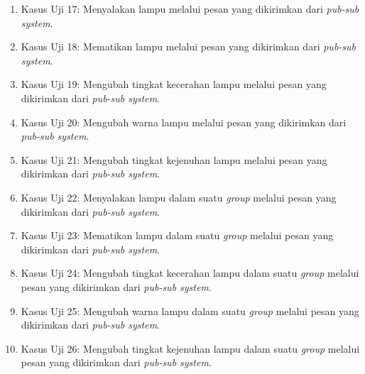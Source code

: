 \begin{enumerate}
	\item Kasus Uji 17: Menyalakan lampu melalui pesan yang dikirimkan dari \textit{pub-sub system}.
	\item Kasus Uji 18: Mematikan lampu melalui pesan yang dikirimkan dari \textit{pub-sub system}.
	\item Kasus Uji 19: Mengubah tingkat kecerahan lampu melalui pesan yang dikirimkan dari \textit{pub-sub system}.
	\item Kasus Uji 20: Mengubah warna lampu melalui pesan yang dikirimkan dari \textit{pub-sub system}.
	\item Kasus Uji 21: Mengubah tingkat kejenuhan lampu melalui pesan yang dikirimkan dari \textit{pub-sub system}.
	\item Kasus Uji 22: Menyalakan lampu dalam suatu \textit{group} melalui pesan yang dikirimkan dari \textit{pub-sub system}.
	\item Kasus Uji 23: Mematikan lampu dalam suatu \textit{group} melalui pesan yang dikirimkan dari \textit{pub-sub system}.
	\item Kasus Uji 24: Mengubah tingkat kecerahan lampu dalam suatu \textit{group} melalui pesan yang dikirimkan dari \textit{pub-sub system}.
	\item Kasus Uji 25: Mengubah warna lampu dalam suatu \textit{group} melalui pesan yang dikirimkan dari \textit{pub-sub system}.
	\item Kasus Uji 26: Mengubah tingkat kejenuhan lampu dalam suatu \textit{group} melalui pesan yang dikirimkan dari \textit{pub-sub system}.	
\end{enumerate}

